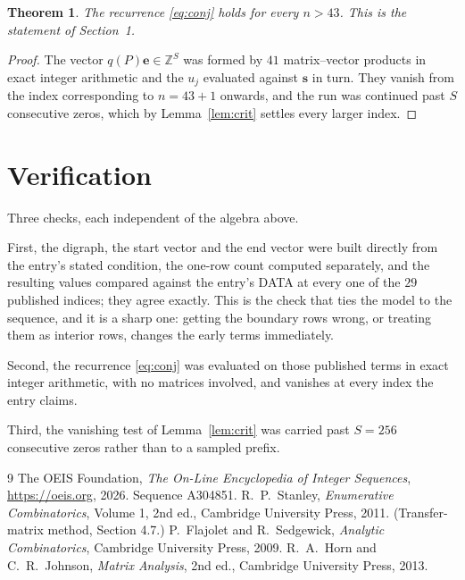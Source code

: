 \documentclass[11pt,a4paper]{article}
\theoremstyle{plain}
\newtheorem{theorem}{Theorem}
\theoremstyle{definition}
\begin{document}
\begin{theorem}
The recurrence \eqref{eq:conj} holds for every $n>43$. This is the statement of
Section~1.
\end{theorem}

\begin{proof}
The vector $q(P)\mathbf{e}\in\mathbb{Z}^{S}$ was formed by $41$ matrix--vector
products in exact integer arithmetic and the $u_j$ evaluated against $\mathbf{s}$ in turn.
They vanish from the index corresponding to $n=43+1$ onwards, and the run was continued
past $S$ consecutive zeros, which by Lemma~\ref{lem:crit} settles every larger index.
\end{proof}

\section{Verification}

Three checks, each independent of the algebra above.

First, the digraph, the start vector and the end vector were built directly from the
entry's stated condition, the one-row count computed separately, and the resulting values
compared against the entry's DATA at every one of the $29$ published indices; they
agree exactly. This is the check that ties the model to the sequence, and it is a sharp one:
getting the boundary rows wrong, or treating them as interior rows, changes the early terms
immediately.

Second, the recurrence \eqref{eq:conj} was evaluated on those published terms in exact
integer arithmetic, with no matrices involved, and vanishes at every index the entry claims.

Third, the vanishing test of Lemma~\ref{lem:crit} was carried past $S=256$ consecutive
zeros rather than to a sampled prefix.

\begin{thebibliography}{9}
 The OEIS Foundation, \emph{The On-Line Encyclopedia of Integer
Sequences}, \url{https://oeis.org}, 2026. Sequence A304851.
 R.~P.~Stanley, \emph{Enumerative Combinatorics}, Volume 1, 2nd ed.,
Cambridge University Press, 2011. (Transfer-matrix method, Section 4.7.)
 P.~Flajolet and R.~Sedgewick, \emph{Analytic Combinatorics}, Cambridge
University Press, 2009.
 R.~A.~Horn and C.~R.~Johnson, \emph{Matrix Analysis}, 2nd ed., Cambridge
University Press, 2013.
\end{thebibliography}
\end{document}
